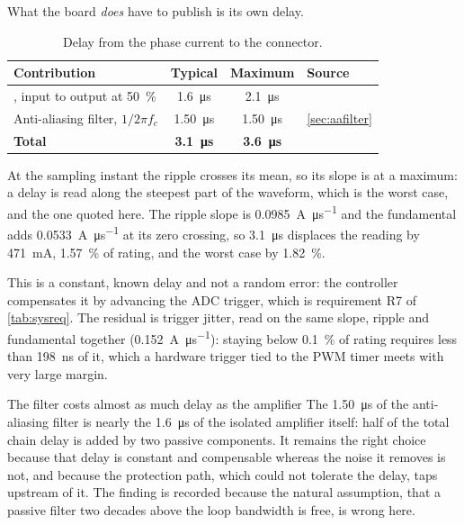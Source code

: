What the board \emph{does} have to publish is its own delay.

\begin{table}[htbp]
\centering
\caption{Delay from the phase current to the connector.}
\label{tab:chaindelay}
\begin{tabular}{lccl}
\toprule
Contribution & Typical & Maximum & Source \\
\midrule
\isoamp{}, input to output at \SI{50}{\percent}
  & \SI{1.6}{\micro\second} & \SI{2.1}{\micro\second} & \cite{ti_amc1302} \\
Anti-aliasing filter, $1/2\pi f_c$
  & \SI{1.50}{\micro\second} & \SI{1.50}{\micro\second} & \cref{sec:aafilter} \\
\midrule
\textbf{Total} & \textbf{\SI{3.1}{\micro\second}} & \textbf{\SI{3.6}{\micro\second}} & \\
\bottomrule
\end{tabular}
\end{table}

At the sampling instant the ripple crosses its mean, so its slope is at a
maximum: a delay is read along the steepest part of the waveform, which is
the worst case, and the one quoted here. The ripple slope is
\SI{0.0985}{\ampere\per\micro\second} and the fundamental adds
\SI{0.0533}{\ampere\per\micro\second} at its zero crossing, so
\SI{3.1}{\micro\second} displaces the reading by \SI{471}{\milli\ampere},
\SI{1.57}{\percent} of rating, and the worst case by
\SI{1.82}{\percent}.

This is a constant, known delay and not a random error: the controller
compensates it by advancing the ADC trigger, which is requirement R7 of
\cref{tab:sysreq}. The residual is trigger jitter, read on the same slope,
ripple and fundamental together (\SI{0.152}{\ampere\per\micro\second}):
staying below \SI{0.1}{\percent} of rating requires less than
\SI{198}{\nano\second} of it, which a hardware trigger tied to the PWM timer
meets with very large margin.

\begin{finding}{The filter costs almost as much delay as the amplifier}
The \SI{1.50}{\micro\second} of the anti-aliasing filter is nearly the
\SI{1.6}{\micro\second} of the isolated amplifier itself: half of the total
chain delay is added by two passive components. It remains the right choice
because that delay is constant and compensable whereas the noise it removes
is not, and because the protection path, which could not tolerate the
delay, taps upstream of it. The finding is recorded because the natural
assumption, that a passive filter two decades above the loop bandwidth is
free, is wrong here.
\end{finding}

